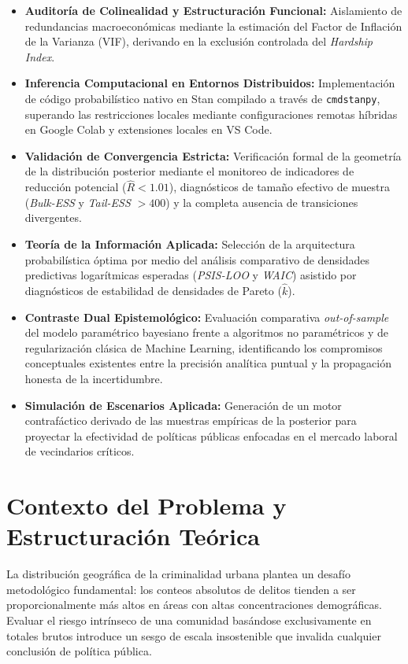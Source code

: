 \documentclass[11pt,a4paper]{article}
\begin{document}
\begin{itemize}
    \item \textbf{Auditoría de Colinealidad y Estructuración Funcional:} Aislamiento de redundancias macroeconómicas mediante la estimación del Factor de Inflación de la Varianza (VIF), derivando en la exclusión controlada del \textit{Hardship Index}.
    \item \textbf{Inferencia Computacional en Entornos Distribuidos:} Implementación de código probabilístico nativo en Stan compilado a través de \texttt{cmdstanpy}, superando las restricciones locales mediante configuraciones remotas híbridas en Google Colab y extensiones locales en VS Code.
    \item \textbf{Validación de Convergencia Estricta:} Verificación formal de la geometría de la distribución posterior mediante el monitoreo de indicadores de reducción potencial ($\hat{R} < 1.01$), diagnósticos de tamaño efectivo de muestra (\textit{Bulk-ESS} y \textit{Tail-ESS} $> 400$) y la completa ausencia de transiciones divergentes.
    \item \textbf{Teoría de la Información Aplicada:} Selección de la arquitectura probabilística óptima por medio del análisis comparativo de densidades predictivas logarítmicas esperadas (\textit{PSIS-LOO} y \textit{WAIC}) asistido por diagnósticos de estabilidad de densidades de Pareto ($\hat{k}$).
    \item \textbf{Contraste Dual Epistemológico:} Evaluación comparativa \textit{out-of-sample} del modelo paramétrico bayesiano frente a algoritmos no paramétricos y de regularización clásica de Machine Learning, identificando los compromisos conceptuales existentes entre la precisión analítica puntual y la propagación honesta de la incertidumbre.
    \item \textbf{Simulación de Escenarios Aplicada:} Generación de un motor contrafáctico derivado de las muestras empíricas de la posterior para proyectar la efectividad de políticas públicas enfocadas en el mercado laboral de vecindarios críticos.
\end{itemize}

\section{Contexto del Problema y Estructuración Teórica}
La distribución geográfica de la criminalidad urbana plantea un desafío metodológico fundamental: los conteos absolutos de delitos tienden a ser proporcionalmente más altos en áreas con altas concentraciones demográficas. Evaluar el riesgo intrínseco de una comunidad basándose exclusivamente en totales brutos introduce un sesgo de escala insostenible que invalida cualquier conclusión de política pública.
\end{document}
